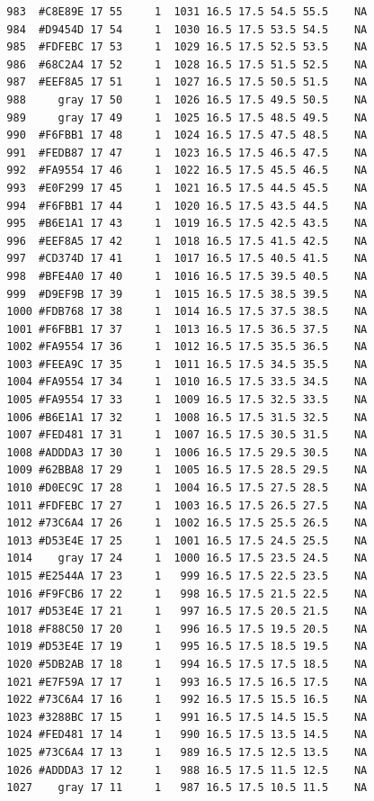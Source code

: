 \documentclass[12pt,twoside]{reedthesis}
\begin{document}
\begin{verbatim}
  983  #C8E89E 17 55     1  1031 16.5 17.5 54.5 55.5    NA
  984  #D9454D 17 54     1  1030 16.5 17.5 53.5 54.5    NA
  985  #FDFEBC 17 53     1  1029 16.5 17.5 52.5 53.5    NA
  986  #68C2A4 17 52     1  1028 16.5 17.5 51.5 52.5    NA
  987  #EEF8A5 17 51     1  1027 16.5 17.5 50.5 51.5    NA
  988     gray 17 50     1  1026 16.5 17.5 49.5 50.5    NA
  989     gray 17 49     1  1025 16.5 17.5 48.5 49.5    NA
  990  #F6FBB1 17 48     1  1024 16.5 17.5 47.5 48.5    NA
  991  #FEDB87 17 47     1  1023 16.5 17.5 46.5 47.5    NA
  992  #FA9554 17 46     1  1022 16.5 17.5 45.5 46.5    NA
  993  #E0F299 17 45     1  1021 16.5 17.5 44.5 45.5    NA
  994  #F6FBB1 17 44     1  1020 16.5 17.5 43.5 44.5    NA
  995  #B6E1A1 17 43     1  1019 16.5 17.5 42.5 43.5    NA
  996  #EEF8A5 17 42     1  1018 16.5 17.5 41.5 42.5    NA
  997  #CD374D 17 41     1  1017 16.5 17.5 40.5 41.5    NA
  998  #BFE4A0 17 40     1  1016 16.5 17.5 39.5 40.5    NA
  999  #D9EF9B 17 39     1  1015 16.5 17.5 38.5 39.5    NA
  1000 #FDB768 17 38     1  1014 16.5 17.5 37.5 38.5    NA
  1001 #F6FBB1 17 37     1  1013 16.5 17.5 36.5 37.5    NA
  1002 #FA9554 17 36     1  1012 16.5 17.5 35.5 36.5    NA
  1003 #FEEA9C 17 35     1  1011 16.5 17.5 34.5 35.5    NA
  1004 #FA9554 17 34     1  1010 16.5 17.5 33.5 34.5    NA
  1005 #FA9554 17 33     1  1009 16.5 17.5 32.5 33.5    NA
  1006 #B6E1A1 17 32     1  1008 16.5 17.5 31.5 32.5    NA
  1007 #FED481 17 31     1  1007 16.5 17.5 30.5 31.5    NA
  1008 #ADDDA3 17 30     1  1006 16.5 17.5 29.5 30.5    NA
  1009 #62BBA8 17 29     1  1005 16.5 17.5 28.5 29.5    NA
  1010 #D0EC9C 17 28     1  1004 16.5 17.5 27.5 28.5    NA
  1011 #FDFEBC 17 27     1  1003 16.5 17.5 26.5 27.5    NA
  1012 #73C6A4 17 26     1  1002 16.5 17.5 25.5 26.5    NA
  1013 #D53E4E 17 25     1  1001 16.5 17.5 24.5 25.5    NA
  1014    gray 17 24     1  1000 16.5 17.5 23.5 24.5    NA
  1015 #E2544A 17 23     1   999 16.5 17.5 22.5 23.5    NA
  1016 #F9FCB6 17 22     1   998 16.5 17.5 21.5 22.5    NA
  1017 #D53E4E 17 21     1   997 16.5 17.5 20.5 21.5    NA
  1018 #F88C50 17 20     1   996 16.5 17.5 19.5 20.5    NA
  1019 #D53E4E 17 19     1   995 16.5 17.5 18.5 19.5    NA
  1020 #5DB2AB 17 18     1   994 16.5 17.5 17.5 18.5    NA
  1021 #E7F59A 17 17     1   993 16.5 17.5 16.5 17.5    NA
  1022 #73C6A4 17 16     1   992 16.5 17.5 15.5 16.5    NA
  1023 #3288BC 17 15     1   991 16.5 17.5 14.5 15.5    NA
  1024 #FED481 17 14     1   990 16.5 17.5 13.5 14.5    NA
  1025 #73C6A4 17 13     1   989 16.5 17.5 12.5 13.5    NA
  1026 #ADDDA3 17 12     1   988 16.5 17.5 11.5 12.5    NA
  1027    gray 17 11     1   987 16.5 17.5 10.5 11.5    NA

\end{verbatim}
\end{document}
